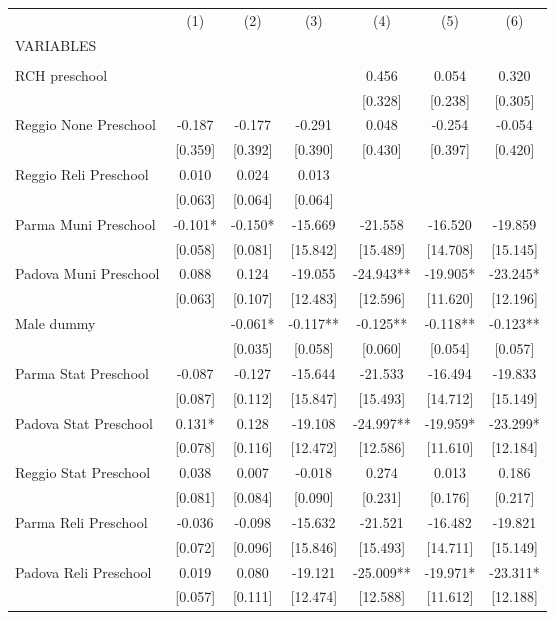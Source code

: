 \begin{tabular}{lcccccc} \hline
 & (1) & (2) & (3) & (4) & (5) & (6) \\
VARIABLES &  &  &  &  &  &  \\ \hline
 &  &  &  &  &  &  \\
RCH preschool &  &  &  & 0.456 & 0.054 & 0.320 \\
 &  &  &  & [0.328] & [0.238] & [0.305] \\
Reggio None Preschool & -0.187 & -0.177 & -0.291 & 0.048 & -0.254 & -0.054 \\
 & [0.359] & [0.392] & [0.390] & [0.430] & [0.397] & [0.420] \\
Reggio Reli Preschool & 0.010 & 0.024 & 0.013 &  &  &  \\
 & [0.063] & [0.064] & [0.064] &  &  &  \\
Parma Muni Preschool & -0.101* & -0.150* & -15.669 & -21.558 & -16.520 & -19.859 \\
 & [0.058] & [0.081] & [15.842] & [15.489] & [14.708] & [15.145] \\
Padova Muni Preschool & 0.088 & 0.124 & -19.055 & -24.943** & -19.905* & -23.245* \\
 & [0.063] & [0.107] & [12.483] & [12.596] & [11.620] & [12.196] \\
Male dummy &  & -0.061* & -0.117** & -0.125** & -0.118** & -0.123** \\
 &  & [0.035] & [0.058] & [0.060] & [0.054] & [0.057] \\
Parma Stat Preschool & -0.087 & -0.127 & -15.644 & -21.533 & -16.494 & -19.833 \\
 & [0.087] & [0.112] & [15.847] & [15.493] & [14.712] & [15.149] \\
Padova Stat Preschool & 0.131* & 0.128 & -19.108 & -24.997** & -19.959* & -23.299* \\
 & [0.078] & [0.116] & [12.472] & [12.586] & [11.610] & [12.184] \\
Reggio Stat Preschool & 0.038 & 0.007 & -0.018 & 0.274 & 0.013 & 0.186 \\
 & [0.081] & [0.084] & [0.090] & [0.231] & [0.176] & [0.217] \\
Parma Reli Preschool & -0.036 & -0.098 & -15.632 & -21.521 & -16.482 & -19.821 \\
 & [0.072] & [0.096] & [15.846] & [15.493] & [14.711] & [15.149] \\
Padova Reli Preschool & 0.019 & 0.080 & -19.121 & -25.009** & -19.971* & -23.311* \\
 & [0.057] & [0.111] & [12.474] & [12.588] & [11.612] & [12.188] \\

\end{tabular}
